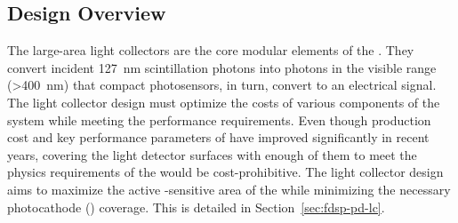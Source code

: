 \subsection{Design Overview} %
\label{sec:pds:des-ov}


 

The  large-area light collectors are the core modular elements of the .  They convert incident \SI{127}{nm} scintillation photons into photons in the visible range (>\SI{400}{nm}) that compact   photosensors, in turn,  convert to an electrical signal. The light collector design must optimize the costs of various components of the system while meeting the performance requirements.  %
Even though production cost and key performance parameters of  have improved significantly in recent years, covering the light detector surfaces with enough of them to meet the physics requirements of the  would be cost-prohibitive. 
The light collector design aims to maximize the active -sensitive area of the  while minimizing the necessary photocathode () coverage. This is detailed in
Section~\ref{sec:fdsp-pd-lc}.

